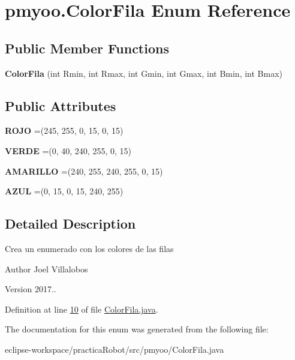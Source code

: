 \hypertarget{enumpmyoo_1_1_color_fila}{}\section{pmyoo.\+Color\+Fila Enum Reference}
\label{enumpmyoo_1_1_color_fila}
\subsection*{Public Member Functions}
\begin{DoxyCompactItemize}
\item 
\mbox{\label{enumpmyoo_1_1_color_fila_ac822879363bbdfb53a4fb44da03beefe}} 
{\bfseries Color\+Fila} (int Rmin, int Rmax, int Gmin, int Gmax, int Bmin, int Bmax)
\end{DoxyCompactItemize}
\subsection*{Public Attributes}
\begin{DoxyCompactItemize}
\item 
\mbox{\label{enumpmyoo_1_1_color_fila_a0f33dddb3e8daf8834050c5c50194504}} 
{\bfseries R\+O\+JO} =(245, 255, 0, 15, 0, 15)
\item 
\mbox{\label{enumpmyoo_1_1_color_fila_a8194291ebb273ed7eabafa10966af1ae}} 
{\bfseries V\+E\+R\+DE} =(0, 40, 240, 255, 0, 15)
\item 
\mbox{\label{enumpmyoo_1_1_color_fila_a84ddd5607ec71e2df78f191e2c21dbd1}} 
{\bfseries A\+M\+A\+R\+I\+L\+LO} =(240, 255, 240, 255, 0, 15)
\item 
\mbox{\label{enumpmyoo_1_1_color_fila_af06119bf777df785efd6342de105fa61}} 
{\bfseries A\+Z\+UL} =(0, 15, 0, 15, 240, 255)
\end{DoxyCompactItemize}


\subsection{Detailed Description}
Crea un enumerado con los colores de las filas \begin{DoxyAuthor}{Author}
Joel Villalobos 
\end{DoxyAuthor}
\begin{DoxyVersion}{Version}
2017.. 
\end{DoxyVersion}


Definition at line \mbox{\hyperlink{_color_fila_8java_source_l00010}{10}} of file \mbox{\hyperlink{_color_fila_8java_source}{Color\+Fila.\+java}}.



The documentation for this enum was generated from the following file\+:\begin{DoxyCompactItemize}
\item 
eclipse-\/workspace/practica\+Robot/src/pmyoo/Color\+Fila.\+java\end{DoxyCompactItemize}
